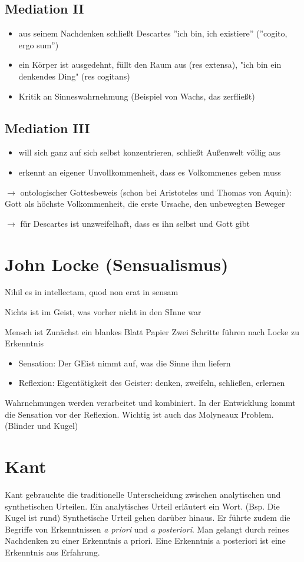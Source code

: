 \documentclass{article}
\begin{document}
\subsection*{Mediation II}
\begin{itemize}
    \item aus seinem Nachdenken schließt Descartes ''ich bin, ich existiere'' (''cogito, ergo sum'')
    \item ein Körper ist ausgedehnt, füllt den Raum aus (res extensa), "ich bin ein denkendes Ding" (res cogitans)
    \item Kritik an Sinneswahrnehmung (Beispiel von Wachs, das zerfließt)
\end{itemize}
\subsection*{Mediation III}
\begin{itemize}
    \item will sich ganz auf sich selbst konzentrieren, schließt Außenwelt völlig aus
    \item erkennt an eigener Unvollkommenheit, dass es Volkommenes geben muss
\end{itemize}
$\rightarrow$ ontologischer Gottesbeweis (schon bei Aristoteles und Thomas von Aquin): Gott als höchste
Volkommenheit, die erste Ursache, den unbewegten Beweger

$\rightarrow$ für Descartes ist unzweifelhaft, dass es ihn selbst und Gott gibt
\section*{John Locke (Sensualismus)}
Nihil es in intellectam, quod non erat in sensam

Nichts ist im Geist, was vorher nicht in den SInne war

Mensch ist Zunächst ein blankes Blatt Papier
Zwei Schritte führen nach Locke zu Erkenntnis
\begin{itemize}
    \item Sensation: Der GEist nimmt auf, was die Sinne ihm liefern
    \item Reflexion: Eigentätigkeit des Geister: denken, zweifeln, schließen, erlernen
\end{itemize}
Wahrnehmungen werden verarbeitet und kombiniert.
In der Entwicklung kommt die Sensation vor der Reflexion. Wichtig ist auch das Molyneaux Problem. (Blinder und Kugel)

\section*{Kant}
Kant gebrauchte die traditionelle Unterscheidung zwischen analytischen und synthetischen Urteilen. Ein analytisches Urteil erläutert ein Wort.
(Bsp. Die Kugel ist rund) Synthetische Urteil gehen darüber hinaus. Er führte zudem die Begriffe von Erkenntnissen \emph{a priori} und 
\emph{a posteriori}. Man gelangt durch reines Nachdenken zu einer Erkenntnis a priori. Eine Erkenntnis a posteriori ist eine Erkenntnis
aus Erfahrung.
\end{document}
